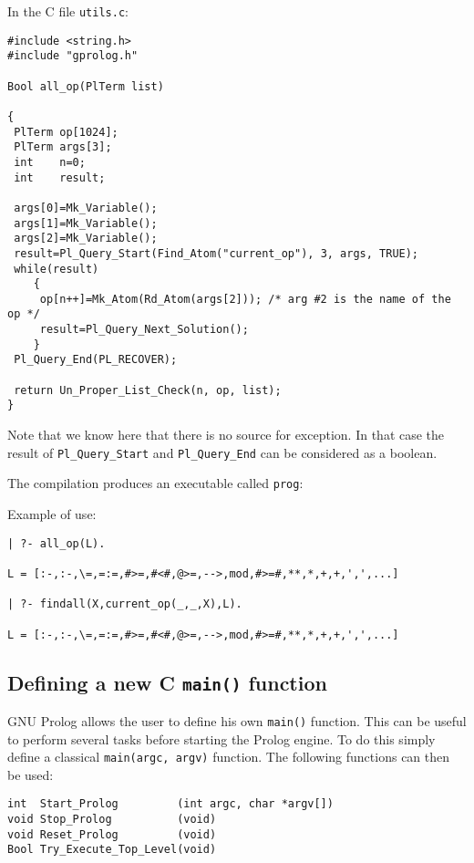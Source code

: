 In the C file \texttt{utils.c}:

\begin{Indentation}
\begin{verbatim}
#include <string.h>
#include "gprolog.h"

Bool all_op(PlTerm list)

{
 PlTerm op[1024];
 PlTerm args[3];
 int    n=0;
 int    result;

 args[0]=Mk_Variable();
 args[1]=Mk_Variable();
 args[2]=Mk_Variable();
 result=Pl_Query_Start(Find_Atom("current_op"), 3, args, TRUE);
 while(result)
    {
     op[n++]=Mk_Atom(Rd_Atom(args[2])); /* arg #2 is the name of the op */
     result=Pl_Query_Next_Solution();
    }
 Pl_Query_End(PL_RECOVER);

 return Un_Proper_List_Check(n, op, list);
}
\end{verbatim}
\end{Indentation}

Note that we know here that there is no source for exception. In that
case the result of \texttt{Pl\_Query\_Start} and \texttt{Pl\_Query\_End} can
be considered as a boolean.

The compilation produces an executable called
\texttt{prog}:


Example of use:

\begin{Indentation}
\begin{verbatim}
| ?- all_op(L).

L = [:-,:-,\=,=:=,#>=,#<#,@>=,-->,mod,#>=#,**,*,+,+,',',...]

| ?- findall(X,current_op(_,_,X),L).

L = [:-,:-,\=,=:=,#>=,#<#,@>=,-->,mod,#>=#,**,*,+,+,',',...]
\end{verbatim}
\end{Indentation}


\subsection{Defining a new C \texttt{main()} function}

GNU Prolog allows the user to define his own \texttt{main()}
function. This can be useful to perform several tasks before starting
the Prolog engine. To do this simply define a classical
\texttt{main(argc, argv)} function. The following functions can then be used:

\begin{Indentation}
\begin{verbatim}
int  Start_Prolog         (int argc, char *argv[])
void Stop_Prolog          (void)
void Reset_Prolog         (void)
Bool Try_Execute_Top_Level(void)
\end{verbatim}
\end{Indentation}

